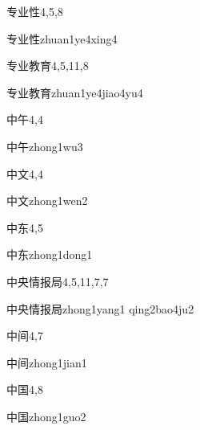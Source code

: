 \begin{entry}{专业性}{4,5,8}
  \begin{phonetics}{专业性}{zhuan1ye4xing4}
  \end{phonetics}
\end{entry}

\begin{entry}{专业教育}{4,5,11,8}
  \begin{phonetics}{专业教育}{zhuan1ye4jiao4yu4}
  \end{phonetics}
\end{entry}

\begin{entry}{中午}{4,4}
  \begin{phonetics}{中午}{zhong1wu3}
  \end{phonetics}
\end{entry}

\begin{entry}{中文}{4,4}
  \begin{phonetics}{中文}{zhong1wen2}
  \end{phonetics}
\end{entry}

\begin{entry}{中东}{4,5}
  \begin{phonetics}{中东}{zhong1dong1}
  \end{phonetics}
\end{entry}

\begin{entry}{中央情报局}{4,5,11,7,7}
  \begin{phonetics}{中央情报局}{zhong1yang1 qing2bao4ju2}
  \end{phonetics}
\end{entry}

\begin{entry}{中间}{4,7}
  \begin{phonetics}{中间}{zhong1jian1}
  \end{phonetics}
\end{entry}

\begin{entry}{中国}{4,8}
  \begin{phonetics}{中国}{zhong1guo2}
  \end{phonetics}
\end{entry}

